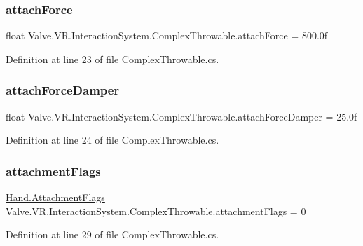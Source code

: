 \subsubsection{\texorpdfstring{attachForce}{attachForce}}
{\footnotesize\ttfamily float Valve.\+V\+R.\+Interaction\+System.\+Complex\+Throwable.\+attach\+Force = 800.\+0f}



Definition at line 23 of file Complex\+Throwable.\+cs.

\mbox{\label{class_valve_1_1_v_r_1_1_interaction_system_1_1_complex_throwable_a9d6bb0fbd46399b63e2f491ba37d5dea}} 
\subsubsection{\texorpdfstring{attachForceDamper}{attachForceDamper}}
{\footnotesize\ttfamily float Valve.\+V\+R.\+Interaction\+System.\+Complex\+Throwable.\+attach\+Force\+Damper = 25.\+0f}



Definition at line 24 of file Complex\+Throwable.\+cs.

\mbox{\label{class_valve_1_1_v_r_1_1_interaction_system_1_1_complex_throwable_a362dd7342445f9dd29afb10efe2bbce7}} 
\subsubsection{\texorpdfstring{attachmentFlags}{attachmentFlags}}
{\footnotesize\ttfamily \mbox{\hyperlink{class_valve_1_1_v_r_1_1_interaction_system_1_1_hand_a61701f82b8f3fac8818954ec71804cb5}{Hand.\+Attachment\+Flags}} Valve.\+V\+R.\+Interaction\+System.\+Complex\+Throwable.\+attachment\+Flags = 0}



Definition at line 29 of file Complex\+Throwable.\+cs.

